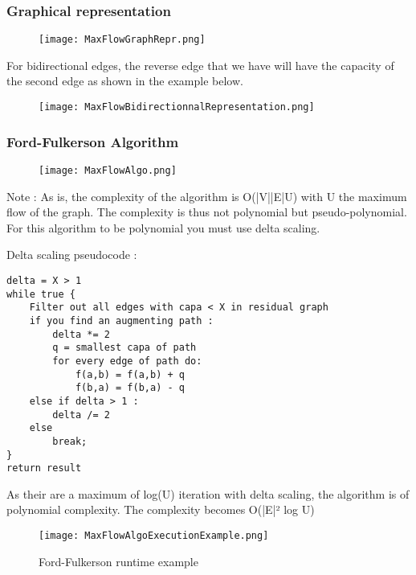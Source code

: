 \subsubsection{Graphical representation}

\begin{figure}[!ht]
    \centering
    \texttt{[image: MaxFlowGraphRepr.png]}
\end{figure}
\FloatBarrier

For bidirectional edges, the reverse edge that we have will have the capacity of the second edge as shown in the example below.

\begin{figure}[!ht]
    \centering
    \texttt{[image: MaxFlowBidirectionnalRepresentation.png]}
\end{figure}
\FloatBarrier

\subsubsection{Ford-Fulkerson Algorithm}

\begin{figure}[!ht]
    \centering
    \texttt{[image: MaxFlowAlgo.png]}
\end{figure}
\FloatBarrier

Note : As is, the complexity of the algorithm is O(|V||E|U) with U the maximum flow of the graph. The complexity is thus not polynomial but pseudo-polynomial. For this algorithm to be polynomial you must use delta scaling. \newline

Delta scaling pseudocode :

\begin{lstlisting}
delta = X > 1
while true {
	Filter out all edges with capa < X in residual graph
	if you find an augmenting path :
		delta *= 2
		q = smallest capa of path
		for every edge of path do:
			f(a,b) = f(a,b) + q
			f(b,a) = f(b,a) - q
	else if delta > 1 :
		delta /= 2
	else
		break;
}
return result
\end{lstlisting}

As their are a maximum of log(U) iteration with delta scaling, the algorithm is of polynomial complexity. The complexity becomes O(|E|² log U)

\begin{figure}[!ht]
    \centering
    \texttt{[image: MaxFlowAlgoExecutionExample.png]}
    \caption{Ford-Fulkerson runtime example}
    \label{fig:Ford-Fulkerson_example}
\end{figure}


